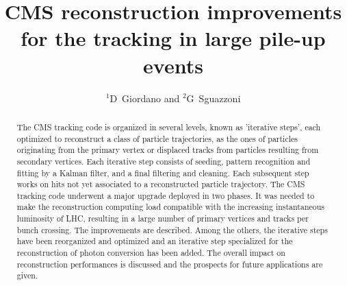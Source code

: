 \documentclass[a4paper]{jpconf}
\begin{document}
\title{CMS reconstruction improvements for the tracking in large pile-up events}

\author{$^1$D~Giordano and $^2$G~Sguazzoni}

\address{$^1$CERN, Information Technology Department, Experiment Support Group, Geneva, Switzerland}
\address{$^2$INFN, Firenze, Italy}



\begin{abstract}
The CMS tracking code is organized in several levels, known as
'iterative steps', each optimized to reconstruct a class of particle
trajectories, as the ones of particles originating from the primary
vertex or displaced tracks from particles resulting from secondary
vertices. Each iterative step consists of seeding, pattern recognition
and fitting by a Kalman filter, and a final filtering and
cleaning. Each subsequent step works on hits not yet associated to a
reconstructed particle trajectory. The CMS tracking code underwent a
major upgrade deployed in two phases. It was needed to make the
reconstruction computing load compatible with the increasing
instantaneous luminosity of LHC, resulting in a large number of
primary vertices and tracks per bunch crossing. The improvements are
described. Among the others, the iterative steps have been reorganized
and optimized and an iterative step specialized for the reconstruction
of photon conversion has been added. 
The overall impact on reconstruction performances is discussed and the
prospects for future applications are given.
\end{abstract}







\end{document}
